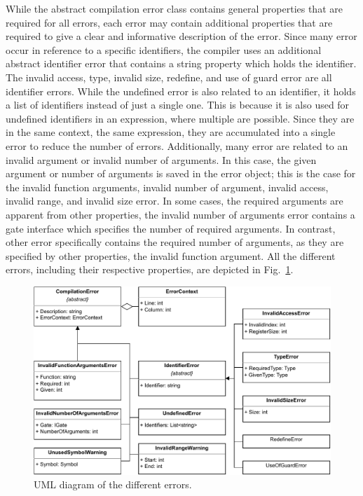 While the abstract compilation error class contains general properties that are required for all errors, each error may contain additional properties that are required to give a clear and informative description of the error. Since many error occur in reference to a specific identifiers, the compiler uses an additional abstract identifier error that contains a string property which holds the identifier. The invalid access, type, invalid size, redefine, and use of guard error are all identifier errors. While the undefined error is also related to an identifier, it holds a list of identifiers instead of just a single one. This is because it is also used for undefined identifiers in an expression, where multiple are possible. Since they are in the same context, \ie the same expression, they are accumulated into a single error to reduce the number of errors. Additionally, many error are related to an invalid argument or invalid number of arguments. In this case, the given argument or number of arguments is saved in the error object; this is the case for the invalid function arguments, invalid number of argument, invalid access, invalid range, and invalid size error. In some cases, the required arguments are apparent from other properties, \eg the invalid number of arguments error contains a gate interface which specifies the number of required arguments. In contrast, other error specifically contains the required number of arguments, as they are specified by other properties, \eg the invalid function argument. All the different errors, including their respective properties, are depicted in Fig.~\ref{fig:implementation_uml_errors}.

\begin{figure}[htp]
    \centering
    \includegraphics[width=.9\textwidth]{../figures/drawio/uml_errors.pdf}
    \caption{UML diagram of the different errors.}
    \label{fig:implementation_uml_errors}
\end{figure}

